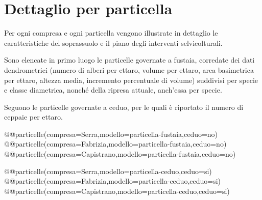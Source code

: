 \clearpage
\section{Dettaglio per particella}
\label{sec:particelle}

Per ogni compresa e ogni particella vengono illustrate in dettaglio le caratteristiche del soprassuolo e il piano degli interventi selvicolturali.

Sono elencate in primo luogo le particelle governate a fustaia, corredate dei dati dendrometrici (numero di alberi per ettaro, volume per ettaro, area basimetrica per ettaro, altezza media, incremento percentuale di volume) suddivisi per specie e classe diametrica, nonché della ripresa attuale, anch'essa per specie.

Seguono le particelle governate a ceduo, per le quali è riportato il numero di ceppaie per ettaro.

\setlength{\LTleft}{0pt}
@@particelle(compresa=Serra,modello=particella-fustaia,ceduo=no)
@@particelle(compresa=Fabrizia,modello=particella-fustaia,ceduo=no)
@@particelle(compresa=Capistrano,modello=particella-fustaia,ceduo=no)

@@particelle(compresa=Serra,modello=particella-ceduo,ceduo=si)
@@particelle(compresa=Fabrizia,modello=particella-ceduo,ceduo=si)
@@particelle(compresa=Capistrano,modello=particella-ceduo,ceduo=si)
\clearpage
